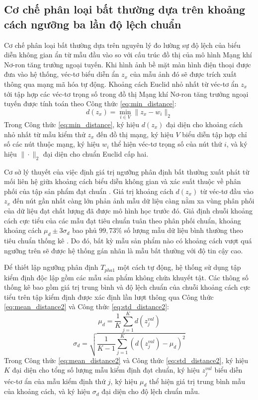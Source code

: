 \subsection{Cơ chế phân loại bất thường dựa trên khoảng cách ngưỡng ba lần độ lệch chuẩn}
\label{subsec:phan_loai_bat_thuong_3sigma}

Cơ chế phân loại bất thường dựa trên nguyên lý đo lường sự độ lệch của biểu diễn không gian ẩn từ mẫu đầu vào so với cấu trúc đồ thị của mô hình Mạng khí Nơ-ron tăng trưởng ngoại tuyến. Khi hình ảnh bề mặt màn hình điện thoại được đưa vào hệ thống, véc-tơ biểu diễn ẩn $z_x$ của mẫu ảnh đó sẽ được trích xuất thông qua mạng mã hóa tự động. Khoảng cách Euclid nhỏ nhất từ véc-tơ ẩn $z_x$ tới tập hợp các véc-tơ trọng số trong đồ thị Mạng khí Nơ-ron tăng trưởng ngoại tuyến được tính toán theo Công thức \ref{eq:min_distance}:
\begin{equation}
\label{eq:min_distance}
d(z_x) = \min_{i \in V} \| z_x - w_i \|_2
\end{equation}
Trong Công thức \ref{eq:min_distance}, ký hiệu $d(z_x)$ đại diện cho khoảng cách nhỏ nhất từ mẫu kiểm thử $z_x$ đến đồ thị mạng, ký hiệu $V$ biểu diễn tập hợp chỉ số các nút thuộc mạng, ký hiệu $w_i$ thể hiện véc-tơ trọng số của nút thứ $i$, và ký hiệu $\| \cdot \|_2$ đại diện cho chuẩn Euclid cấp hai.

Cơ sở lý thuyết của việc định giá trị ngưỡng phân định bất thường xuất phát từ mối liên hệ giữa khoảng cách biểu diễn không gian và xác suất thuộc về phân phối của tập sản phẩm đạt chuẩn \cite{pukelsheim1994three, nist2012ehandbook}. Giá trị khoảng cách $d(z_x)$ từ véc-tơ đầu vào $z_x$ đến nút gần nhất càng lớn phản ảnh mẫu dữ liệu càng nằm xa vùng phân phối của dữ liệu đạt chất lượng đã được mô hình học trước đó. Giả định chuỗi khoảng cách cực tiểu của các mẫu đạt tiêu chuẩn tuân theo phân phối chuẩn, khoảng khoảng cách $\mu_d \pm 3\sigma_d$ bao phủ $99{,}73\%$ số lượng mẫu dữ liệu bình thường theo tiêu chuẩn thống kê \cite{nist2012ehandbook}. Do đó, bất kỳ mẫu sản phẩm nào có khoảng cách vượt quá ngưỡng trên sẽ được hệ thống gán nhãn là mẫu bất thường với độ tin cậy cao.

Để thiết lập ngưỡng phân định $T_{pha1}$ một cách tự động, hệ thống sử dụng tập kiểm định độc lập gồm các mẫu sản phẩm không chứa khuyết tật. Các thông số thống kê bao gồm giá trị trung bình và độ lệch chuẩn của chuỗi khoảng cách cực tiểu trên tập kiểm định được xác định lần lượt thông qua Công thức \ref{eq:mean_distance2} và Công thức \ref{eq:std_distance2}:
\begin{equation}
\label{eq:mean_distance2}
\mu_d = \frac{1}{K} \sum_{j=1}^{K} d(z_j^{val})
\end{equation}
\begin{equation}
\label{eq:std_distance2}
\sigma_d = \sqrt{\frac{1}{K-1} \sum_{j=1}^{K} \left( d(z_j^{val}) - \mu_d \right)^2}
\end{equation}
Trong Công thức \ref{eq:mean_distance2} và Công thức \ref{eq:std_distance2}, ký hiệu $K$ đại diện cho tổng số lượng mẫu kiểm định đạt chuẩn, ký hiệu $z_j^{val}$ biểu diễn véc-tơ ẩn của mẫu kiểm định thứ $j$, ký hiệu $\mu_d$ thể hiện giá trị trung bình mẫu của khoảng cách, và ký hiệu $\sigma_d$ đại diện cho độ lệch chuẩn mẫu.

